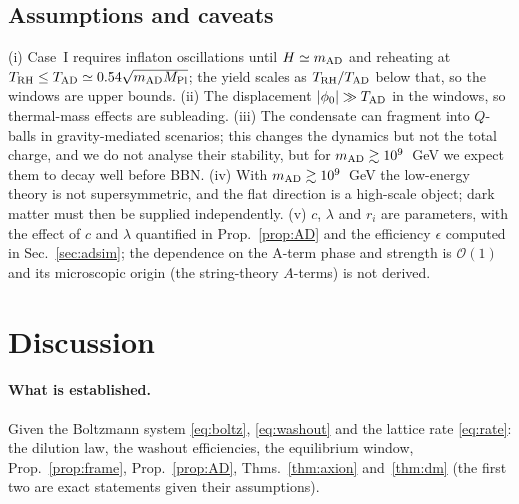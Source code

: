 \documentclass[11pt]{article}
\newcommand{\MP}{M_{\rm Pl}}
\begin{document}
\subsection{Assumptions and caveats}
(i) Case~I requires inflaton oscillations until $H\simeq m_{\rm AD}$ and reheating at $T_{\rm RH}\le T_{\rm AD}\simeq0.54\sqrt{m_{\rm AD}\MP}$; the yield scales as $T_{\rm RH}/T_{\rm AD}$ below that, so the windows are upper bounds. (ii) The displacement $|\phi_0|\gg T_{\rm AD}$ in the windows, so thermal-mass effects are subleading. (iii) The condensate can fragment into $Q$-balls in gravity-mediated scenarios; this changes the dynamics but not the total charge, and we do not analyse their stability, but for $m_{\rm AD}\gtrsim10^{9}$~GeV we expect them to decay well before BBN. (iv) With $m_{\rm AD}\gtrsim10^{9}$~GeV the low-energy theory is not supersymmetric, and the flat direction is a high-scale object; dark matter must then be supplied independently. (v) $c$, $\lambda$ and $r_i$ are parameters, with the effect of $c$ and $\lambda$ quantified in Prop.~\ref{prop:AD} and the efficiency $\epsilon$ computed in Sec.~\ref{sec:adsim}; the dependence on the A-term phase and strength is $\mathcal O(1)$ and its microscopic origin (the string-theory $A$-terms) is not derived.

\section{Discussion}\label{sec:disc}
\paragraph{What is established.} Given the Boltzmann system \eqref{eq:boltz}, \eqref{eq:washout} and the lattice rate \eqref{eq:rate}: the dilution law, the washout efficiencies, the equilibrium window, Prop.~\ref{prop:frame}, Prop.~\ref{prop:AD}, Thms.~\ref{thm:axion} and~\ref{thm:dm} (the first two are exact statements given their assumptions).
\end{document}
